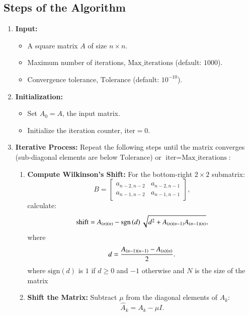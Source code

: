 \documentclass[journal]{IEEEtran}
\begin{document}
\subsection{Steps of the Algorithm}
\begin{enumerate}
    \item \textbf{Input:} 
    \begin{itemize}
        \item A square matrix $A$ of size $n \times n$.
        \item Maximum number of iterations, $\text{Max\_iterations}$ (default: $1000$).
        \item Convergence tolerance, $\text{Tolerance}$ (default: $10^{-10}$).
    \end{itemize}

    \item \textbf{Initialization:} 
    \begin{itemize}
        \item Set $A_0 = A$, the input matrix.
        \item Initialize the iteration counter, $\text{iter} = 0$.
    \end{itemize}

    \item \textbf{Iterative Process:}
    Repeat the following steps until the matrix converges (sub-diagonal elements are below $\text{Tolerance}$) or $\text{iter} = \text{Max\_iterations}$:
    
    \begin{enumerate}
        \item \textbf{Compute Wilkinson's Shift:} For the bottom-right $2 \times 2$ submatrix:
        \[
        B = \begin{bmatrix}
        a_{n-2,n-2} & a_{n-2,n-1} \\
        a_{n-1,n-2} & a_{n-1,n-1}
        \end{bmatrix},
        \]
        calculate:
       \begin{align}
            \text{shift} = A_{\left(n\right)\left(n\right)} - \mathop{\mathrm{sgn}}\left(d\right) \sqrt{d^2 + A_{\left(n\right)\left(n-1\right)} A_{\left(n-1\right)\left(n\right)}},
            \end{align}
        where
        \begin{align}
        d = \frac{A_{\left(n-1\right)\left(n-1\right)} - A_{\left(n\right)\left(n\right)}}{2}.
        \end{align}
        where $\text{sign}(d)$ is $1$ if $d \geq 0$ and $-1$ otherwise and $N$ is the size of the matrix
        \item \textbf{Shift the Matrix:} Subtract $\mu$ from the diagonal elements of $A_k$:
        \[
        \hat{A}_k = A_k -\mu I.
        \]


\end{enumerate}
\end{enumerate}
\end{document}
